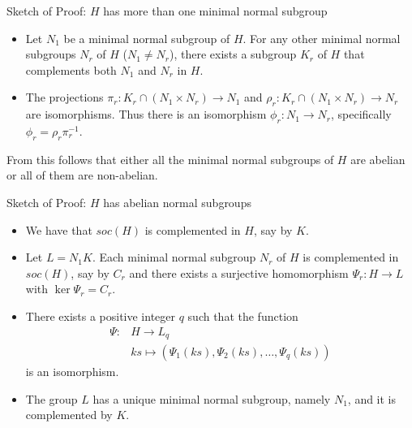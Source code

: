 \documentclass{beamer}
\begin{document}
\begin{frame}{Sketch of Proof: $H$ has more than one minimal normal subgroup}
    \begin{itemize}
        \item Let $N_1$ be a minimal normal subgroup of $H$. For any other minimal normal subgroups $N_r$ of $H$ ($N_1 \ne N_r$), there exists a subgroup $K_r$ of $H$ that complements both $N_1$ and $N_r$ in $H$.
        \item<2-> The projections $\pi_r : K_r \cap (N_1 \times N_r) \rightarrow N_1$ and $\rho_r : K_r \cap (N_1 \times N_r) \rightarrow N_r$ are isomorphisms. Thus there is an isomorphism $\phi_r : N_1 \rightarrow N_r$, specifically $\phi_r = \rho_r\pi_r^{-1}$.
    \end{itemize}
     From this follows that either all the minimal normal subgroups of $H$ are abelian or all of them are non-abelian.
\end{frame}

\begin{frame}{Sketch of Proof: $H$ has abelian normal subgroups}
    \begin{itemize}
        \item We have that $soc(H)$ is complemented in $H$, say by $K$.
        \item<2-> Let $L = N_1K$. Each minimal normal subgroup $N_r$ of $H$ is complemented in $soc(H)$, say by $C_r$ and there exists a surjective homomorphism $\Psi_r \colon H \rightarrow L$ with $\ker \Psi_r = C_r$.
        \item<3-> There exists a positive integer $q$ such that the function 
        \begin{align*}
            \Psi \colon &H \longrightarrow L_q \\
                     &ks \mapsto  (\Psi_1(ks),\Psi_2(ks),\ldots ,\Psi_q(ks))
        \end{align*} is an isomorphism.
        \item<4-> The group $L$ has a unique minimal normal subgroup, namely $N_1$, and it is complemented by $K$.
    \end{itemize}
\end{frame}
\end{document}
